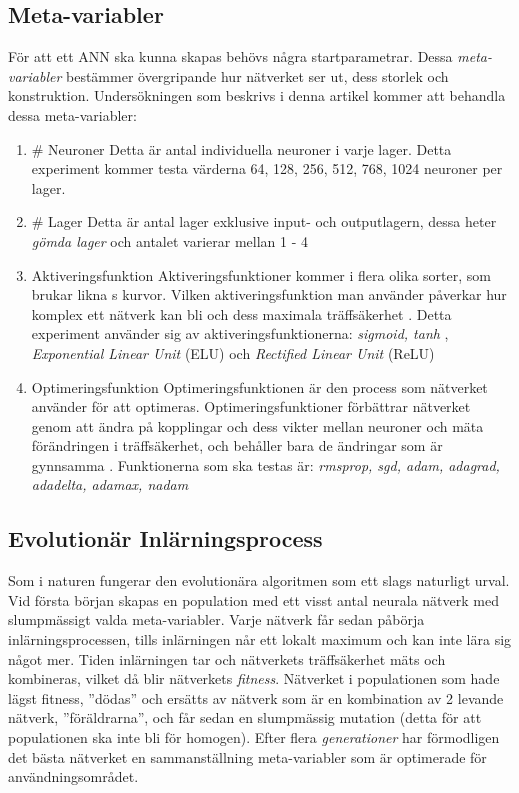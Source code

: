 \documentclass[a4paper, 12pt]{article}
\begin{document}
    \subsection{Meta-variabler}
    För att ett ANN ska kunna skapas behövs några startparametrar. Dessa \textit{meta-variabler} bestämmer övergripande hur nätverket ser ut, dess storlek och konstruktion. Undersökningen som beskrivs i denna artikel kommer att behandla dessa meta-variabler:
    \begin{enumerate}
      \item \# Neuroner
      \newline
      Detta är antal individuella neuroner i varje lager. Detta experiment kommer testa värderna 64, 128, 256, 512, 768, 1024 neuroner per lager.
      \item \# Lager
      \newline
      Detta är antal lager exklusive input- och outputlagern, dessa heter \textit{gömda lager} och antalet varierar mellan 1 - 4
      \item Aktiveringsfunktion
      \newline
      Aktiveringsfunktioner kommer i flera olika sorter, som brukar likna s kurvor. Vilken aktiveringsfunktion man använder påverkar hur komplex ett nätverk kan bli och dess maximala träffsäkerhet \parencite{jain1996artificial}. Detta experiment använder sig av aktiveringsfunktionerna: \textit{sigmoid, tanh} \parencite{karlik2011performance}, \textit{Exponential Linear Unit} (ELU) \parencite{clevert2015fast} och \textit{Rectified Linear Unit} (ReLU) \parencite{xu2015empirical}
      \item Optimeringsfunktion
      \newline
      Optimeringsfunktionen är den process som nätverket använder för att optimeras. Optimeringsfunktioner förbättrar nätverket genom att ändra på kopplingar och dess vikter mellan neuroner och mäta förändringen i träffsäkerhet, och behåller bara de ändringar som är gynnsamma \parencite{TypesofO34:online}. Funktionerna som ska testas är: \textit{rmsprop, sgd, adam, adagrad, adadelta, adamax, nadam} \parencite{kingma2014adam}
    \end{enumerate}


    \subsection{Evolutionär Inlärningsprocess}
    Som i naturen fungerar den evolutionära algoritmen som ett slags naturligt urval. Vid första början skapas en population med ett visst antal neurala nätverk med slumpmässigt valda meta-variabler. Varje nätverk får sedan påbörja inlärningsprocessen, tills inlärningen når ett lokalt maximum och kan inte lära sig något mer. Tiden inlärningen tar och nätverkets träffsäkerhet mäts och kombineras, vilket då blir nätverkets \textit{fitness}. Nätverket i populationen som hade lägst fitness, ”dödas” och ersätts av nätverk som är en kombination av 2 levande nätverk, ”föräldrarna”, och får sedan en slumpmässig mutation (detta för att populationen ska inte bli för homogen). Efter flera \textit{generationer} har förmodligen det bästa nätverket en sammanställning meta-variabler som är optimerade för användningsområdet. \parencite{yao1997new}
\end{document}
